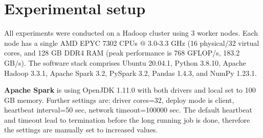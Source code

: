 \section{Experimental setup}
\label{sec:experimental_setup}

All experiments were conducted on a Hadoop cluster using 3 worker nodes. 
Each node has a single AMD EPYC 7302 CPUs @ 3.0-3.3 GHz (16 physical/32 virtual cores, and 128 GB DDR4 RAM (peak performance is 768 GFLOP/s, 183.2 GB/s).
The software stack comprises Ubuntu 20.04.1, Python 3.8.10, Apache Hadoop 3.3.1, Apache Spark 3.2, PySpark 3.2, Pandas 1.4.3, and NumPy 1.23.1.

\textbf{Apache Spark} is using OpenJDK 1.11.0 with both drivers and local set to 100 GB memory.
Further settings are: driver cores=32, deploy mode is client, heartbeat interval=50 sec, network timeout=100000 sec.
The default heartbeat and timeout lead to termination before the long running job is done, therefore the settings are manually set to increased values.

